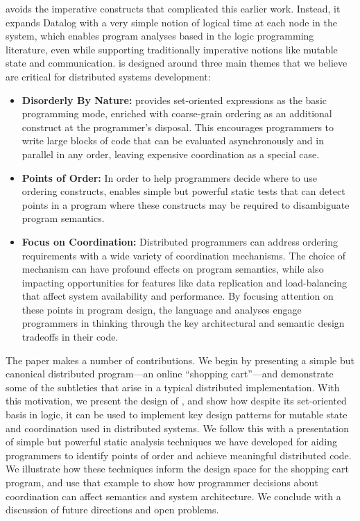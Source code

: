 \lang avoids the imperative constructs that complicated this earlier work.  Instead, it expands Datalog with a very simple notion of logical time at each node in the system, which enables program analyses based in the logic programming literature, even while supporting traditionally imperative notions like mutable state and communication.  \lang is designed around three main themes that we believe are critical for distributed systems development:
\begin{itemize}
    \item {\bf Disorderly By Nature:} \lang provides set-oriented expressions as the basic programming mode, enriched with coarse-grain ordering as an additional construct at the programmer's disposal.  This encourages programmers to write large blocks of code that can be evaluated asynchronously and in parallel in any order, leaving expensive coordination as a special case.
    \item {\bf Points of Order:} In order to help programmers decide where to use ordering constructs, \lang enables simple but powerful static tests that can detect points in a program where these constructs may be required to disambiguate program semantics.
    \item {\bf Focus on Coordination:} Distributed programmers can address ordering requirements with a wide variety of coordination mechanisms. The choice of mechanism can have profound effects on program semantics, while also impacting opportunities for features like data replication and load-balancing that affect system availability and performance.  By focusing attention on these points in program design, the language and analyses engage programmers in thinking through the key architectural and semantic design tradeoffs in their code.
\end{itemize}

The paper makes a number of contributions.  We begin by presenting a simple but canonical distributed program---an online ``shopping cart''---and demonstrate some of the subtleties that arise in a typical distributed implementation.  With this motivation, we present the design of \lang, and show how despite its set-oriented basis in logic, it can be used to implement key design patterns for mutable state and coordination used in distributed systems.  We follow this with a presentation of simple but powerful static analysis techniques we have developed for aiding programmers to identify points of order and achieve meaningful distributed code.  We illustrate how these techniques inform the design space for the shopping cart program, and use that example to show how programmer decisions about coordination can affect semantics and system architecture.  We conclude with a discussion of future directions and open problems.